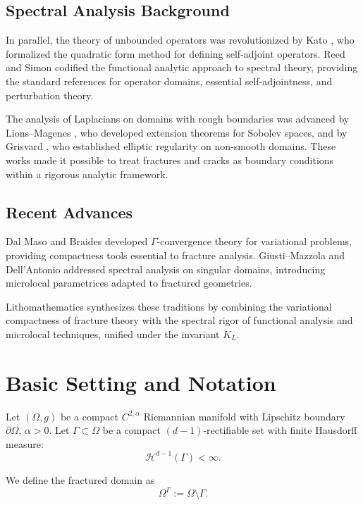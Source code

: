 \subsection{Spectral Analysis Background}
In parallel, the theory of unbounded operators was revolutionized by Kato
\cite{Kato1966}, who formalized the quadratic form method for defining
self-adjoint operators. Reed and Simon \cite{ReedSimon1975} codified the
functional analytic approach to spectral theory, providing the standard
references for operator domains, essential self-adjointness, and perturbation
theory.

The analysis of Laplacians on domains with rough boundaries was advanced by
Lions--Magenes \cite{LionsMagenes1968}, who developed extension theorems for
Sobolev spaces, and by Grisvard \cite{Grisvard1985}, who established elliptic
regularity on non-smooth domains. These works made it possible to treat
fractures and cracks as boundary conditions within a rigorous analytic
framework.

\subsection{Recent Advances}
Dal Maso \cite{DalMaso1993} and Braides \cite{Braides2002} developed
$\Gamma$-convergence theory for variational problems, providing compactness
tools essential to fracture analysis. Giusti--Mazzola \cite{GiustiMazzola2020}
and Dell'Antonio \cite{DellAntonio2019} addressed spectral analysis on
singular domains, introducing microlocal parametrices adapted to fractured
geometries.

Lithomathematics synthesizes these traditions by combining the variational
compactness of fracture theory with the spectral rigor of functional analysis
and microlocal techniques, unified under the invariant $K_L$.

\section{Basic Setting and Notation}
Let $(\Omega,g)$ be a compact $C^{2,\alpha}$ Riemannian manifold with
Lipschitz boundary $\partial \Omega$, $\alpha>0$. Let
$\Gamma \subset \Omega$ be a compact $(d-1)$-rectifiable set with finite
Hausdorff measure:
\[
\mathcal{H}^{d-1}(\Gamma) < \infty.
\]

We define the fractured domain as
\[
\Omega^\Gamma := \Omega \setminus \Gamma .
\]


